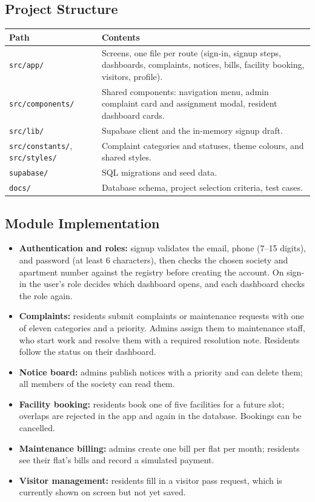\documentclass{tietreport}
\renewcommand{\_}{\textunderscore\allowbreak}
\begin{document}
\subsection{Project Structure}

\begin{longtable}{L{4.6cm} L{9.2cm}}
\toprule
\textbf{Path} & \textbf{Contents} \\
\midrule
\endhead
\texttt{src/app/} & Screens, one file per route (sign-in, signup steps,
dashboards, complaints, notices, bills, facility booking, visitors,
profile). \\
\texttt{src/components/} & Shared components: navigation menu, admin
complaint card and assignment modal, resident dashboard cards. \\
\texttt{src/lib/} & Supabase client and the in-memory signup draft. \\
\texttt{src/constants/}, \texttt{src/styles/} & Complaint categories and
statuses, theme colours, and shared styles. \\
\texttt{supabase/} & SQL migrations and seed data. \\
\texttt{docs/} & Database schema, project selection criteria, test cases. \\
\bottomrule
\end{longtable}

\subsection{Module Implementation}

\begin{itemize}
  \item \textbf{Authentication and roles:} signup validates the email,
  phone (7--15 digits), and password (at least 6 characters), then checks
  the chosen society and apartment number against the registry before
  creating the account. On sign-in the user's role decides which dashboard
  opens, and each dashboard checks the role again.
  \item \textbf{Complaints:} residents submit complaints or maintenance
  requests with one of eleven categories and a priority. Admins assign them
  to maintenance staff, who start work and resolve them with a required
  resolution note. Residents follow the status on their dashboard.
  \item \textbf{Notice board:} admins publish notices with a priority and
  can delete them; all members of the society can read them.
  \item \textbf{Facility booking:} residents book one of five facilities
  for a future slot; overlaps are rejected in the app and again in the
  database. Bookings can be cancelled.
  \item \textbf{Maintenance billing:} admins create one bill per flat per
  month; residents see their flat's bills and record a simulated payment.
  \item \textbf{Visitor management:} residents fill in a visitor pass
  request, which is currently shown on screen but not yet saved.
\end{itemize}
\end{document}
